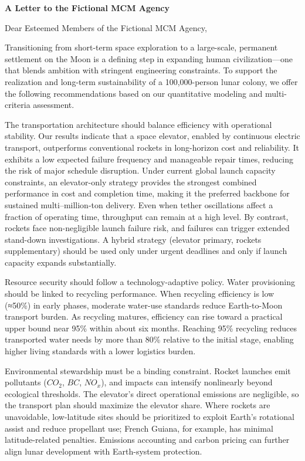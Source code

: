 \documentclass{mcmthesis}
\begin{document}
\newpage

\begin{center}
{\Large \textbf{A Letter to the Fictional MCM Agency}}
\end{center}

\vspace{0.5cm}

\noindent Dear Esteemed Members of the Fictional MCM Agency,

\indent Transitioning from short-term space exploration to a large-scale, permanent settlement on the Moon is a defining step in expanding human civilization—one that blends ambition with stringent engineering constraints. To support the realization and long-term sustainability of a 100,000-person lunar colony, we offer the following recommendations based on our quantitative modeling and multi-criteria assessment.

\indent The transportation architecture should balance efficiency with operational stability. Our results indicate that a space elevator, enabled by continuous electric transport, outperforms conventional rockets in long-horizon cost and reliability. It exhibits a low expected failure frequency and manageable repair times, reducing the risk of major schedule disruption. Under current global launch capacity constraints, an elevator-only strategy provides the strongest combined performance in cost and completion time, making it the preferred backbone for sustained multi–million-ton delivery. Even when tether oscillations affect a fraction of operating time, throughput can remain at a high level. By contrast, rockets face non-negligible launch failure risk, and failures can trigger extended stand-down investigations. A hybrid strategy (elevator primary, rockets supplementary) should be used only under urgent deadlines and only if launch capacity expands substantially.

\indent Resource security should follow a technology-adaptive policy. Water provisioning should be linked to recycling performance. When recycling efficiency is low (≈50\%) in early phases, moderate water-use standards reduce Earth-to-Moon transport burden. As recycling matures, efficiency can rise toward a practical upper bound near 95\% within about six months. Reaching 95\% recycling reduces transported water needs by more than 80\% relative to the initial stage, enabling higher living standards with a lower logistics burden.

\indent Environmental stewardship must be a binding constraint. Rocket launches emit pollutants ($CO_2$, $BC$, $NO_x$), and impacts can intensify nonlinearly beyond ecological thresholds. The elevator’s direct operational emissions are negligible, so the transport plan should maximize the elevator share. Where rockets are unavoidable, low-latitude sites should be prioritized to exploit Earth’s rotational assist and reduce propellant use; French Guiana, for example, has minimal latitude-related penalties. Emissions accounting and carbon pricing can further align lunar development with Earth-system protection.
\end{document}
